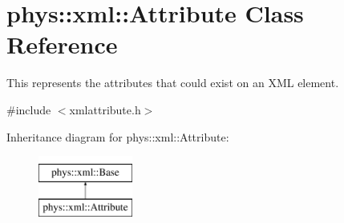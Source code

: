 \hypertarget{classphys_1_1xml_1_1Attribute}{
\section{phys::xml::Attribute Class Reference}
\label{da/ddf/classphys_1_1xml_1_1Attribute}
}


This represents the attributes that could exist on an XML element.  




{\ttfamily \#include $<$xmlattribute.h$>$}

Inheritance diagram for phys::xml::Attribute:\begin{figure}[H]
\begin{center}
\leavevmode
\includegraphics[height=2.000000cm]{da/ddf/classphys_1_1xml_1_1Attribute}
\end{center}
\end{figure}
